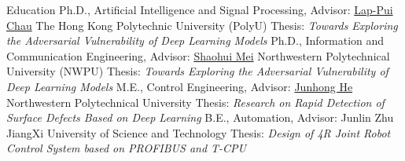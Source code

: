 \begin{rubric}{Education}
\entry*[01/2024 -- Present]%
	Ph.D., Artificial Intelligence and Signal Processing, Advisor: \href{https://www.polyu.edu.hk/eee/people/academic-staff-and-teaching-staff/prof-chau-lap-pui/}{Lap-Pui Chau} \newline 
		The Hong Kong Polytechnic University (PolyU)\newline
		Thesis: \emph{Towards Exploring the Adversarial Vulnerability of Deep Learning Models}
%
\entry*[04/2022 -- 06/2026]%
	Ph.D., Information and Communication Engineering, Advisor: \href{https://teacher.nwpu.edu.cn/meishaohui.html}{Shaohui Mei} \newline 
	Northwestern Polytechnical University (NWPU) \newline
		Thesis: \emph{Towards Exploring the Adversarial Vulnerability of Deep Learning Models}
%
\entry*[09/2019 -- 03/2022]%
	M.E., Control Engineering, Advisor: \href{https://teacher.nwpu.edu.cn/hejunhong.html}{Junhong He} \newline 
        Northwestern Polytechnical University \newline
	  Thesis: \emph{Research on Rapid Detection of Surface Defects Based on Deep Learning}
% 
\entry*[09/2015 -- 07/2019]%
	B.E., Automation, Advisor: Junlin Zhu \newline 
        JiangXi University of Science and Technology \newline 
	  Thesis: \emph{Design of 4R Joint Robot Control System based on PROFIBUS and T-CPU}
\end{rubric}